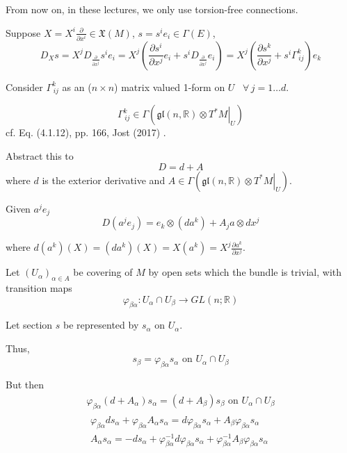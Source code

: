 From now on, in these lectures, we only use torsion-free connections. 



Suppose $X = X^i \frac{\partial}{\partial x^i} \in \mathfrak{X}(M)$, $s = s^i e_i \in \Gamma(E)$,
\[
D_X s =X^j D_{\frac{\partial }{ \partial x^j} } s^i e_i = X^j \left( \frac{\partial s^i}{\partial x^j} e_i + s^i D_{\frac{\partial }{\partial x^j} } e_i \right) = X^j \left( \frac{\partial s^k}{\partial x^j } + s^i \Gamma^k_{\, ij} \right) e_k
\]

Consider $\Gamma^k_{\, ij}$ as an ($n\times n$) matrix valued 1-form on $U$ \, $\forall \, j = 1 \dots d$.

\begin{equation}
	\Gamma^k_{\, ij} \in \Gamma( \mathfrak{gl}(n, \mathbb{R}) \otimes \left. T^* M \right|_U)
\end{equation}
cf. Eq. (4.1.12), pp. 166, Jost (2017) \cite{dgdt:Jost2017}.

Abstract this to
\[
D = d+A
\]
where $d$ is the exterior derivative and $A \in \Gamma( \mathfrak{gl}(n, \mathbb{R}) \otimes \left. T^* M \right|_U)$.

Given $a^j e_j$
\[
D(a^j e_j) = e_k \otimes (da^k) + A_j a \otimes dx^j
\]

where $d(a^k)(X) = (da^k)(X) = X(a^k) = X^j \frac{\partial a^k}{\partial x^j}$. 

Let $(U_{\alpha})_{\alpha \in A}$ be covering of $M$ by open sets which the bundle is trivial, with transition maps
\[
\varphi_{\beta \alpha} : U_{\alpha} \cap U_{\beta} \to GL(n;\mathbb{R})
\]

Let section $s$ be represented by $s_{\alpha}$ on $U_{\alpha}$.

Thus,
\[
s_{\beta} = \varphi_{\beta \alpha} s_{\alpha} \text{ on } U_{\alpha} \cap U_{\beta}
\]

But then
\[
\begin{gathered}
	\varphi_{\beta \alpha} (d+A_{\alpha}) s_{\alpha} = (d+A_{\beta}) s_{\beta} \text{ on } U_{\alpha} \cap U_{\beta} \\
	\begin{gathered}
		\varphi_{\beta \alpha} ds_{\alpha} + \varphi_{\beta \alpha} A_{\alpha} s_{\alpha} = d\varphi_{\beta \alpha} s_{\alpha} + A_{\beta} \varphi_{\beta \alpha} s_{\alpha} \\
		A_{\alpha} s_{\alpha} = -ds_{\alpha} + \varphi^{-1}_{\beta \alpha} d\varphi_{\beta \alpha} s_{\alpha} + \varphi^{-1}_{\beta \alpha} A_{\beta} \varphi_{\beta \alpha} s_{\alpha}
	\end{gathered}
\end{gathered}
\]

